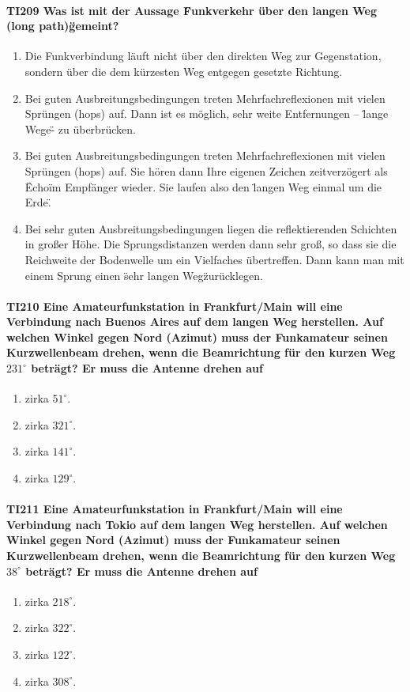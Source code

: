 \documentclass[8pt]{article}
\begin{document}
\paragraph*{TI209 Was ist mit der Aussage \"Funkverkehr über den langen Weg (long path)\" gemeint?} 
\begin{enumerate}[nolistsep,label=\Alph*]
\item Die Funkverbindung läuft nicht über den direkten Weg zur Gegenstation, sondern über die dem kürzesten Weg entgegen gesetzte Richtung.
\item Bei guten Ausbreitungsbedingungen treten Mehrfachreflexionen mit vielen Sprüngen (hops) auf. Dann ist es möglich, sehr weite Entfernungen – \"lange Wege\" - zu überbrücken.
\item Bei guten Ausbreitungsbedingungen treten Mehrfachreflexionen mit vielen Sprüngen (hops) auf. Sie hören dann Ihre eigenen Zeichen zeitverzögert als \"Echo\" im Empfänger wieder. Sie laufen also den \"langen Weg einmal um die Erde\".
\item Bei sehr guten Ausbreitungsbedingungen liegen die reflektierenden Schichten in großer Höhe. Die Sprungsdistanzen werden dann sehr groß, so dass sie die Reichweite der Bodenwelle um ein Vielfaches übertreffen. Dann kann man mit einem Sprung einen \"sehr langen Weg\" zurücklegen.
\end{enumerate}

\paragraph*{TI210 Eine Amateurfunkstation in Frankfurt/Main will eine Verbindung nach Buenos Aires auf dem langen Weg herstellen. Auf welchen Winkel gegen Nord (Azimut) muss der Funkamateur seinen Kurzwellenbeam drehen, wenn die Beamrichtung für den kurzen Weg $231^{\circ}$ beträgt? Er muss die Antenne drehen auf}
\begin{enumerate}[nolistsep,label=\Alph*]
\item zirka $51^{\circ}$.
\item zirka $321^{\circ}$.
\item zirka $141^{\circ}$.
\item zirka $129^{\circ}$.
\end{enumerate}

\paragraph*{TI211 Eine Amateurfunkstation in Frankfurt/Main will eine Verbindung nach Tokio auf dem langen Weg herstellen. Auf welchen Winkel gegen Nord (Azimut) muss der Funkamateur seinen Kurzwellenbeam drehen, wenn die Beamrichtung für den kurzen Weg $38^{\circ}$ beträgt? Er muss die Antenne drehen auf} 
\begin{enumerate}[nolistsep,label=\Alph*]
\item zirka $218^{\circ}$.
\item zirka $322^{\circ}$.
\item zirka $122^{\circ}$.
\item zirka $308^{\circ}$.
\end{enumerate}
\end{document}
